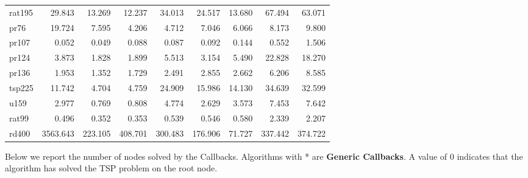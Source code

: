 \begin{center}
\begin{longtable}{lrrrrrrrr}
rat195  & 29.843 & 13.269 & 12.237 & 34.013 & 24.517 & 13.680 & 67.494 & 63.071\\
pr76  & 19.724 & 7.595 & 4.206 & 4.712 & 7.046 & 6.066 & 8.173 & 9.800\\
pr107   & 0.052 & 0.049 & 0.088 & 0.087 & 0.092 & 0.144 & 0.552 & 1.506\\
pr124  & 3.873 & 1.828 & 1.899 & 5.513 & 3.154 & 5.490 & 22.828 & 18.270\\
pr136  & 1.953 & 1.352 & 1.729 & 2.491 & 2.855 & 2.662 & 6.206 & 8.585\\
tsp225  & 11.742 & 4.704 & 4.759 & 24.909 & 15.986 & 14.130 & 34.639 & 32.599\\
u159  & 2.977 & 0.769 & 0.808 & 4.774 & 2.629 & 3.573 & 7.453 & 7.642\\
rat99   & 0.496 & 0.352 & 0.353 & 0.539 & 0.546 & 0.580 & 2.339 & 2.207\\
rd400  & 3563.643 & 223.105 & 408.701 & 300.483 & 176.906 & 71.727 & 337.442 & 374.722\\

\end{longtable}
\end{center}


\setlength\LTleft{0cm}
\noindent
Below we report the number of nodes solved by the Callbacks. Algorithms with * are \textbf{Generic Callbacks}. A value of 0 indicates that the algorithm has solved the TSP problem on the root node.

